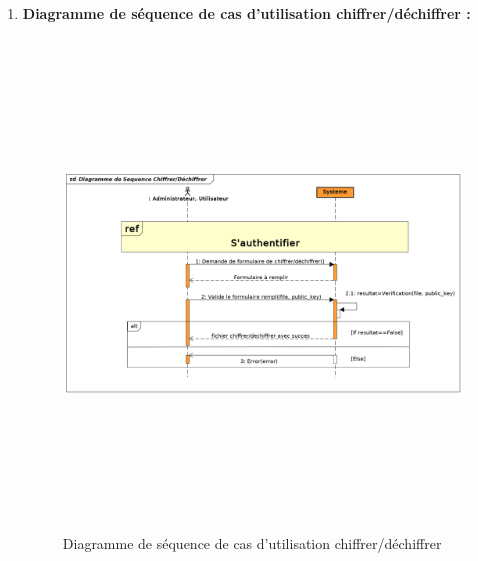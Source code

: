 \begin{enumerate}
		 	\item \textbf{Diagramme de séquence de cas d'utilisation chiffrer/déchiffrer :}
		 	\begin{figure}[H]
		 		\centering
		 		\includegraphics[width=18cm, height=13cm]{../Diagrammes/DiagrammeSequences/chiffrerDechiffrer.png}
		 		\caption{Diagramme de séquence de cas d'utilisation chiffrer/déchiffrer}
		 		\label{diaseq5}
		 	\end{figure}
		 	

\end{enumerate}
